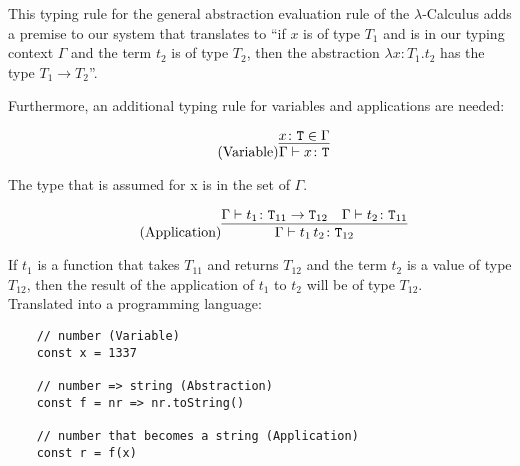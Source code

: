 This typing rule for the general abstraction evaluation rule
of the $\lambda$-Calculus adds
a premise to our system that translates to ``if $x$ is of
type $T_1$ and is in our typing context $\Gamma$ and
the term $t_2$ is of type $T_2$, then the abstraction
$\lambda x \colon T_1 . t_2$ has the type $T_1 \rightarrow T_2$''.

Furthermore, an additional typing rule for variables and applications
are needed:

\begin{equation*}
    \tag{Variable}
    \infer{
        \Gamma \vdash x \colon \texttt{T}
    }{
        x \colon \texttt{T} \in \Gamma
    }
\end{equation*}

The type that is assumed for x is in the set of $\Gamma$.

\begin{equation*}
    \tag{Application}
    \infer{
        \Gamma \vdash t_1\,t_2 \colon \texttt{T}_{12}
    }{
        \Gamma \vdash t_1 \colon \texttt{T}_{11} \rightarrow \texttt{T}_{12}
        &
        \Gamma \vdash t_2 \colon \texttt{T}_{11}
    }
\end{equation*}

If $t_1$ is a function that takes $T_{11}$ and returns
$T_{12}$ and the term $t_2$ is a value of type $T_{12}$, then
the result of the application of $t_1$ to $t_2$ will
be of type $T_{12}$.
\\[12pt]
Translated into a programming language:

\begin{verbatim}
    // number (Variable)
    const x = 1337

    // number => string (Abstraction)
    const f = nr => nr.toString()

    // number that becomes a string (Application)
    const r = f(x)
\end{verbatim}
